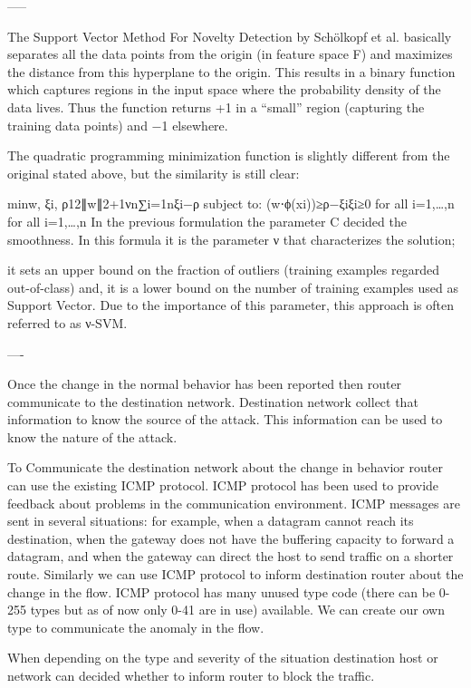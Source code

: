 \documentclass[10pt,oneside,a4paper]{article}
\begin{document}
-----

The Support Vector Method For Novelty Detection by Schölkopf et al. basically separates all the data points from the origin (in feature space F) and maximizes the distance from this hyperplane to the origin. This results in a binary function which captures regions in the input space where the probability density of the data lives. Thus the function returns +1 in a “small” region (capturing the training data points) and −1 elsewhere.

The quadratic programming minimization function is slightly different from the original stated above, but the similarity is still clear:

minw, ξi, ρ12∥w∥2+1νn∑i=1nξi−ρ subject to: (w⋅ϕ(xi))≥ρ−ξiξi≥0 for all i=1,…,n for all i=1,…,n
In the previous formulation the parameter C decided the smoothness. In this formula it is the parameter ν that characterizes the solution;

it sets an upper bound on the fraction of outliers (training examples regarded out-of-class) and,
it is a lower bound on the number of training examples used as Support Vector.
Due to the importance of this parameter, this approach is often referred to as ν-SVM.


----

Once the change in the normal behavior has been reported then router communicate to the destination network. Destination network collect that information to know the source of the attack. This information can be used to know the nature of the attack.

To Communicate the destination network about the change in behavior router can use the existing ICMP protocol. ICMP protocol has been used to provide feedback about problems in the communication environment. ICMP messages are sent in several situations:  for example, when a datagram cannot reach its destination, when the gateway does not have the buffering capacity to forward a datagram, and when the gateway can direct the host to send traffic on a shorter route.\cite{icmp} Similarly we can use ICMP protocol to inform destination router about the change in the flow. ICMP protocol has many unused type code (there can be 0-255 types but as of now only 0-41 are in use) available. We can create our own type to communicate the anomaly in the flow.

When depending on the type and severity of the situation destination host or network can decided whether to inform router to block the traffic.
\end{document}
